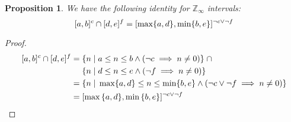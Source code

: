 \documentclass{article}
\theoremstyle{definition}
\theoremstyle{plain}
\newtheorem{prop}{Proposition}
\newcommand{\zinf}{\textnormal{$\mathbb{Z}_\infty$}}
\newcommand{\interv}[3]{\textnormal{$\lbrack#1,#2\rbrack^{#3}$}}
\begin{document}
\begin{prop}{}
  We have the following identity for \zinf{} intervals:
%
  \begin{equation*}
    \interv{a}{b}{c} \cap \interv{d}{e}{f} =
      \interv{\max \{a,d\}}{\min \{b,e\}}{\neg c \vee \neg f}
  \end{equation*}\label{def:zinf-intersect}
\end{prop}
%
\begin{proof}
  \begin{align*}
    \interv{a}{b}{c} \cap \interv{d}{e}{f} = &
      \; \{ n \;|\; a \leq n \leq b \wedge (\neg c \implies n \neq 0) \}
      \;\cap \\
      & \; \{ n \;|\; d \leq n \leq e \wedge (\neg f \implies n \neq 0) \}
      \\
    = & \; \{ n \;|\; \max \{a,d\} \leq n \leq \min \{b,e\} \wedge (\neg c
      \vee \neg f \implies n \neq 0) \} \\
    = & \; \interv{\max{\{a,d\}}}{\min{\{b,e\}}}{\neg c \vee \neg f}
  \end{align*}
\end{proof}
\end{document}
